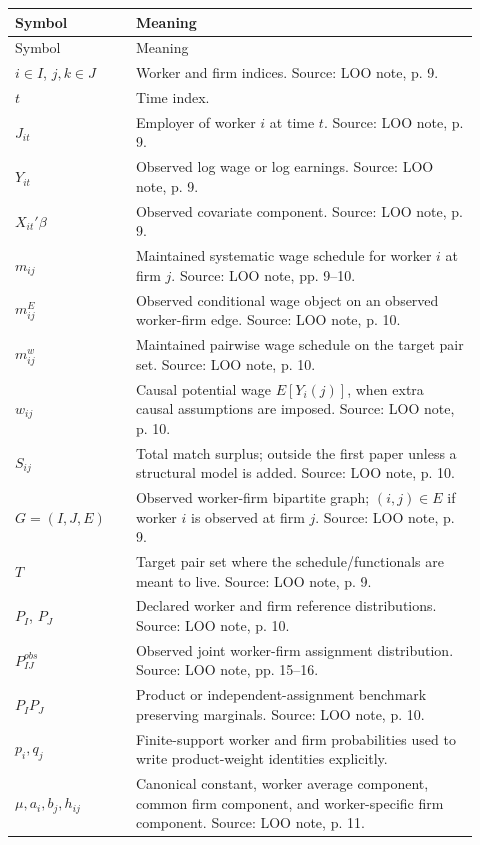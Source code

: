 \documentclass[11pt]{article}
\begin{document}
\begin{longtable}{>{\raggedright\arraybackslash}p{0.24\linewidth}
                  >{\raggedright\arraybackslash}p{0.68\linewidth}}
\toprule
Symbol & Meaning \\
\midrule
\endfirsthead
\toprule
Symbol & Meaning \\
\midrule
\endhead
\(i\in I\), \(j,k\in J\) & Worker and firm indices. Source: LOO note, p. 9. \\
\(t\) & Time index. \\
\(J_{it}\) & Employer of worker \(i\) at time \(t\). Source: LOO note, p. 9. \\
\(Y_{it}\) & Observed log wage or log earnings. Source: LOO note, p. 9. \\
\(X_{it}'\beta\) & Observed covariate component. Source: LOO note, p. 9. \\
\(m_{ij}\) & Maintained systematic wage schedule for worker \(i\) at firm \(j\). Source: LOO note, pp. 9--10. \\
\(m^E_{ij}\) & Observed conditional wage object on an observed worker-firm edge. Source: LOO note, p. 10. \\
\(m^w_{ij}\) & Maintained pairwise wage schedule on the target pair set. Source: LOO note, p. 10. \\
\(w_{ij}\) & Causal potential wage \(E[Y_i(j)]\), when extra causal assumptions are imposed. Source: LOO note, p. 10. \\
\(S_{ij}\) & Total match surplus; outside the first paper unless a structural model is added. Source: LOO note, p. 10. \\
\(G=(I,J,E)\) & Observed worker-firm bipartite graph; \((i,j)\in E\) if worker \(i\) is observed at firm \(j\). Source: LOO note, p. 9. \\
\(T\) & Target pair set where the schedule/functionals are meant to live. Source: LOO note, p. 9. \\
\(P_I\), \(P_J\) & Declared worker and firm reference distributions. Source: LOO note, p. 10. \\
\(P_{IJ}^{obs}\) & Observed joint worker-firm assignment distribution. Source: LOO note, pp. 15--16. \\
\(P_I P_J\) & Product or independent-assignment benchmark preserving marginals. Source: LOO note, p. 10. \\
\(p_i,q_j\) & Finite-support worker and firm probabilities used to write product-weight identities explicitly. \\
\(\mu,a_i,b_j,h_{ij}\) & Canonical constant, worker average component, common firm component, and worker-specific firm component. Source: LOO note, p. 11. \\

\end{longtable}
\end{document}
